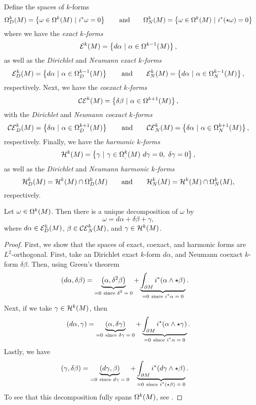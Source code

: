 \documentclass[12pt]{article}
\begin{document}
Define the spaces of $k$-forms
\[
\kforms{k}{D} = \left\{ \omega \in \kforms{k}{} ~\vert~ i^* \omega = 0 \right\} \qquad \textrm{and} \qquad \kforms{k}{N} = \left\{ \omega \in \kforms{k}{} ~\vert~ i^* (\star \omega) = 0 \right\}
\]
where we have the \emph{exact $k$-forms}
\[
\exact{k}{} = \left\{d\alpha ~\vert~ \alpha \in \kforms{k-1}{}\right\},
\]
as well as the \emph{Dirichlet} and \emph{Neumann exact $k$-forms}
\[
\exact{k}{D} = \left\{ d\alpha ~\vert~ \alpha \in \kforms{k-1}{D} \right\} \qquad \textrm{and} \qquad \exact{k}{N} = \left\{ d\alpha ~\vert~ \alpha \in \kforms{k-1}{N} \right\}, 
\]
respectively.  Next, we have the \emph{coexact $k$-forms}
\[
\coexact{k}{} = \left\{ \delta \beta ~\vert~ \alpha \in \kforms{k+1}{}\right\},
\]
with the \emph{Dirichlet} and \emph{Neumann coexact $k$-forms}
\[
\coexact{k}{D} = \left\{ \delta\alpha ~\vert~ \alpha \in \kforms{k+1}{D} \right\} \qquad \textrm{and} \qquad \coexact{k}{N} = \left\{ \delta \alpha ~\vert~ \alpha \in \kforms{k+1}{N} \right\}, 
\]
respectively. Finally, we have the \emph{harmonic $k$-forms}
\[
\harmonic{k}{} = \left\{ \gamma ~\vert~ \gamma \in \kforms{k}, ~ d\gamma = 0, ~\delta \gamma =0 \right\},
\]
as well as the \emph{Dirichlet} and \emph{Neumann harmonic $k$-forms}
\[
\harmonic{k}{D} = \harmonic{k}{} \cap \kforms{k}{D} \qquad \textrm{and} \qquad \harmonic{k}{N} = \harmonic{k}{} \cap \kforms{k}{N},
\]
respectively.


\begin{theorem}
Let $\omega \in \kforms{k}{}$. Then there is a unique decomposition of $\omega$ by
\[
\omega = d\alpha + \delta \beta + \gamma,
\]
where $d\alpha \in \exact{k}{D}$, $\beta \in \coexact{k}{N}$, and $\gamma \in \harmonic{k}{}$.  
\end{theorem}

\begin{proof}
First, we show that the spaces of exact, coexact, and harmonic forms are $L^2$-orthogonal.  First, take an Dirichlet exact $k$-form $d\alpha$, and Neumann coexact $k$-form $\delta \beta$.  Then, using Green's theorem
\begin{align*}
	\kforminnprod{d\alpha}{\delta \beta} &= \underbrace{\kforminnprod{\alpha}{\delta^2 \beta}}_{=0~ \textrm{since $\delta^2 = 0$}} + \underbrace{\int_{\partial M} i^*(\alpha\wedge \star \beta)}_{=0~ \textrm{since $i^*\alpha = 0$}}.
\end{align*}
Next, if we take $\gamma \in \harmonic{k}{}$, then
\[
	\kforminnprod{d\alpha}{\gamma} = \underbrace{\kforminnprod{\alpha}{\delta\gamma}}_{=0~ \textrm{since $\delta \gamma =0$}} + \underbrace{\int_{\partial M} i^*(\alpha \wedge \star \gamma)}_{=0~ \textrm{since $i^*\alpha = 0$}}.
\]
Lastly, we have
\begin{align*}
	\kforminnprod{\gamma}{\delta \beta} &= \underbrace{\kforminnprod{d\gamma}{\beta}}_{=0~ \textrm{since $d \gamma =0$}} + \underbrace{\int_{\partial M} i^*(d\gamma \wedge \star \beta)}_{=0~ \textrm{since $i^*( \star \beta) = 0$}}.
\end{align*}
To see that this decomposition fully spans $\kforms{k}{}$, see \cite{schwarz}.
\end{proof}
\end{document}

